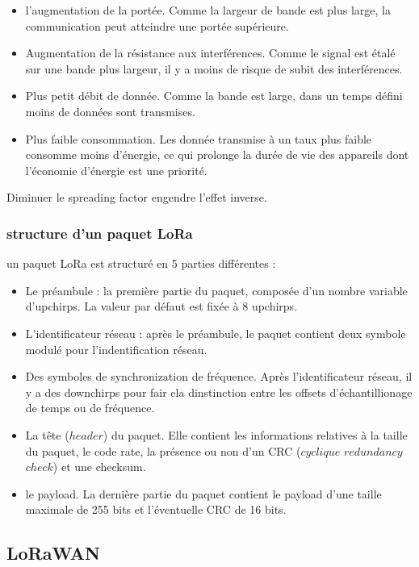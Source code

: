 \documentclass[12pt,a4paper,oneside, titlepage]{report}
\begin{document}
\begin{itemize}
\item l'augmentation de la portée. Comme la largeur de bande est plus large, la communication peut atteindre une portée supérieure.
\item Augmentation de la résistance aux interférences. Comme le signal est étalé sur une bande plus largeur, il y a moins de risque de subit des interférences.
\item Plus petit débit de donnée. Comme la bande est large, dans un temps défini moins de données sont transmises.
\item Plus faible consommation. Les donnée transmise à un taux plus faible consomme moins d'énergie, ce qui prolonge la durée de vie des appareils dont l'économie d'énergie est une priorité.
\end{itemize}

Diminuer le spreading factor engendre l'effet inverse.

\subsubsection{structure d'un paquet LoRa}

un paquet LoRa est structuré en 5 parties différentes :

\begin{itemize}
\item Le préambule : la première partie du paquet, composée d'un nombre variable d'upchirps. La valeur par défaut est fixée à 8 upchirps.
\item L'identificateur réseau : après le préambule, le paquet contient deux symbole modulé pour l'indentification réseau.
\item Des symboles de synchronization de fréquence. Après l'identificateur réseau, il y a des downchirps pour fair ela dinstinction entre les offsets d'échantillionage de temps ou de fréquence.
\item La tête ($header$) du paquet. Elle contient les informations relatives à la taille du paquet, le code rate, la présence ou non d'un CRC ($cyclique$ $redundancy$ $check$) et une checksum.
\item le payload. La dernière partie du paquet contient le payload d'une taille maximale de 255 bits et l'éventuelle CRC de 16 bits.
\end{itemize}




\subsection{LoRaWAN}
\end{document}
